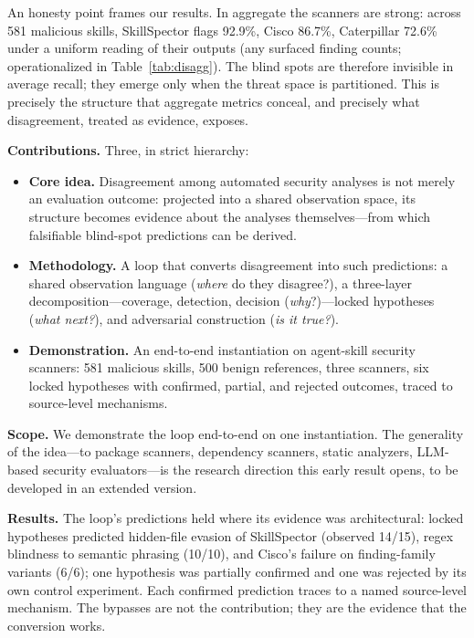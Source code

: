 \documentclass[sigconf,nonacm]{acmart}
\begin{document}
An honesty point frames our results.
In aggregate the scanners are strong: across 581 malicious skills, SkillSpector flags 92.9\%, Cisco 86.7\%, Caterpillar 72.6\% under a uniform reading of their outputs (any surfaced finding counts; operationalized in Table~\ref{tab:disagg}).
The blind spots are therefore invisible in average recall; they emerge only when the threat space is partitioned.
This is precisely the structure that aggregate metrics conceal, and precisely what disagreement, treated as evidence, exposes.

\noindent\textbf{Contributions.} Three, in strict hierarchy:
\begin{itemize}
  \item \textbf{Core idea.} Disagreement among automated security analyses is not merely an evaluation outcome: projected into a shared observation space, its structure becomes evidence about the analyses themselves---from which falsifiable blind-spot predictions can be derived.
  \item \textbf{Methodology.} A loop that converts disagreement into such predictions: a shared observation language (\emph{where} do they disagree?), a three-layer decomposition---coverage, detection, decision (\emph{why}?)---locked hypotheses (\emph{what next?}), and adversarial construction (\emph{is it true?}).
  \item \textbf{Demonstration.} An end-to-end instantiation on agent-skill security scanners: 581 malicious skills, 500 benign references, three scanners, six locked hypotheses with confirmed, partial, and rejected outcomes, traced to source-level mechanisms.
\end{itemize}

\noindent\textbf{Scope.} We demonstrate the loop end-to-end on one instantiation.
The generality of the idea---to package scanners, dependency scanners, static analyzers, LLM-based security evaluators---is the research direction this early result opens, to be developed in an extended version.

\noindent\textbf{Results.} The loop's predictions held where its evidence was architectural: locked hypotheses predicted hidden-file evasion of SkillSpector (observed 14/15), regex blindness to semantic phrasing (10/10), and Cisco's failure on finding-family variants (6/6); one hypothesis was partially confirmed and one was rejected by its own control experiment. Each confirmed prediction traces to a named source-level mechanism. The bypasses are not the contribution; they are the evidence that the conversion works.
\end{document}
